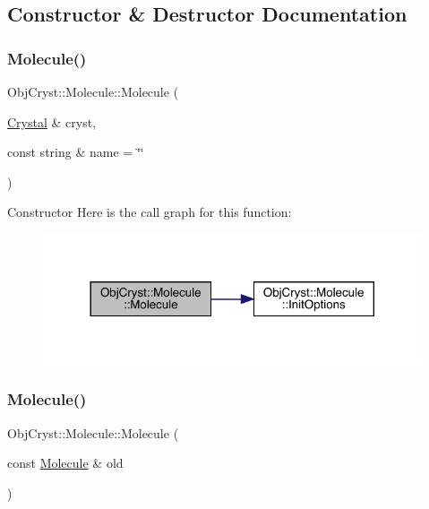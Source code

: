 \subsection{Constructor \& Destructor Documentation}
\mbox{\label{class_obj_cryst_1_1_molecule_ad4132a293e7f253c730676ed3720f961}} 
\subsubsection{\texorpdfstring{Molecule()}{Molecule()}\hspace{0.1cm}{\footnotesize\ttfamily [1/2]}}
{\footnotesize\ttfamily Obj\+Cryst\+::\+Molecule\+::\+Molecule (\begin{DoxyParamCaption}\item[{\mbox{\hyperlink{class_obj_cryst_1_1_crystal}{Crystal}} \&}]{cryst,  }\item[{const string \&}]{name = {\ttfamily \char`\"{}\char`\"{}} }\end{DoxyParamCaption})}

Constructor Here is the call graph for this function\+:
\nopagebreak
\begin{figure}[H]
\begin{center}
\leavevmode
\includegraphics[width=317pt]{class_obj_cryst_1_1_molecule_ad4132a293e7f253c730676ed3720f961_cgraph}
\end{center}
\end{figure}
\mbox{\label{class_obj_cryst_1_1_molecule_a896c80a621aa990de3d36e214965cd49}} 
\subsubsection{\texorpdfstring{Molecule()}{Molecule()}\hspace{0.1cm}{\footnotesize\ttfamily [2/2]}}
{\footnotesize\ttfamily Obj\+Cryst\+::\+Molecule\+::\+Molecule (\begin{DoxyParamCaption}\item[{const \mbox{\hyperlink{class_obj_cryst_1_1_molecule}{Molecule}} \&}]{old }\end{DoxyParamCaption})}

